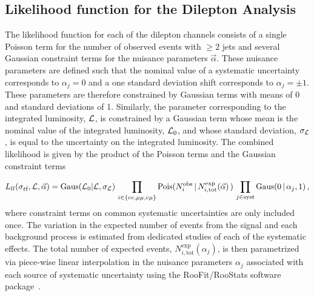 \subsection{Likelihood function for the Dilepton Analysis}
\label{sec:dilep}


The likelihood function for each of the dilepton channels consists of a single Poisson term for the number of observed events with $\ge2$ jets and several Gaussian constraint terms for the nuisance parameters $\vec{\alpha}$.   
These nuisance parameters are defined such that the nominal value of a systematic uncertainty corresponds to $\alpha_j = 0$ and a one standard deviation shift corresponds to $\alpha_j = \pm 1$.
These parameters are therefore constrained by Gaussian terms with means of 0 and standard deviations of 1.
Similarly, the parameter corresponding to the integrated luminosity, ${\cal L}$, is constrained by a Gaussian term whose mean is the nominal value of the integrated luminosity, ${\cal L}_{0}$, and whose standard deviation, $\sigma_{{\cal L}}$, is equal to the uncertainty on the integrated luminosity.
The combined likelihood is given by the product of the Poisson terms and the Gaussian constraint terms

\begin{equation}\label{Eq:dileplikelihood}
  L_{ll}(\sigma_{t\bar{t}}, {\cal L}, \vec{\alpha}) = \text{Gaus}({\cal L}_0 | {\cal L}, \sigma_{\cal L})\, \prod_{i\in \{ ee,\mu\mu,e\mu\} }  \text{Pois}(N^{\text{obs}}_i \,|\, N^{\text{exp}}_{i, \text{tot}}(\vec{\alpha})\,) \,  \prod_{j\in \text{syst}} \text{Gaus}( 0 \,|\, \alpha_{j}, 1) \,,
\end{equation}
where constraint terms on common systematic uncertainties are only included once.  
The variation in the expected number of events from the signal and each background process is estimated from dedicated studies of each of the systematic effects.  
The total number of expected events, $N^{\text{exp}}_{i,\text{tot}}(\alpha_j)$, is then parametrized via piece-wise linear interpolation in the nuisance parameters $\alpha_j$ associated with each source of systematic uncertainty using the RooFit/RooStats software package~\cite{Verkerke:2003ir,Moneta:2010pm}.

